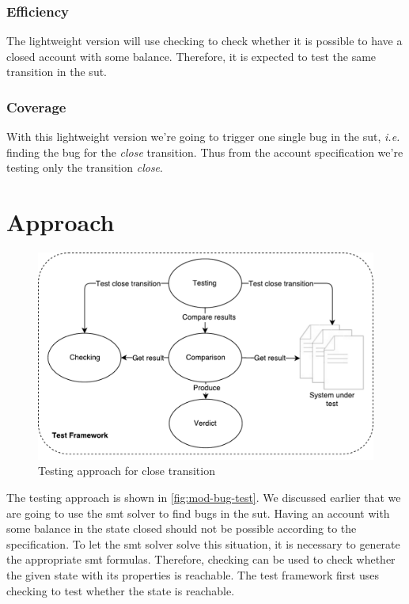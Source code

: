 \subsubsection{Efficiency}
The lightweight version will use checking to check whether it is possible to have
a closed account with some balance. Therefore, it is expected to test the same
transition in the \gls{sut}.

\subsubsection{Coverage}
With this lightweight version we're going to trigger one single bug in the \gls{sut},
\textit{i.e.} finding the bug for the \textit{close} transition. Thus from the
account specification we're testing only the transition \textit{close}.

\section{Approach}

\begin{figure}[h!]
  \centering
  \includegraphics[width=\linewidth{}]{figures/test-modified-bug.pdf}
  \caption{Testing approach for close transition}\label{fig:mod-bug-test}
\end{figure}
\FloatBarrier

The testing approach is shown in \autoref{fig:mod-bug-test}.
We discussed earlier that we are going to use the \gls{smt} solver to find bugs in the
\gls{sut}. Having an account with some balance in the state closed should not be possible
according to the specification. To let the \gls{smt} solver solve this situation, it
is necessary to generate the appropriate \gls{smt} formulas. Therefore, checking can
be used to check whether the given state with its properties is reachable.
The test framework first uses checking to test whether the state is reachable.

